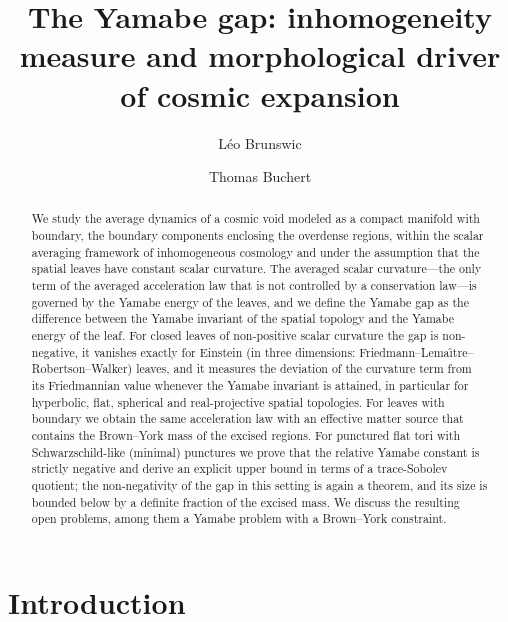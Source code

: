 \documentclass[aps,prd,reprint,amsmath,amssymb,nofootinbib,longbibliography]{revtex4-2}
\theoremstyle{plain}
\theoremstyle{definition}
\theoremstyle{remark}
\begin{document}
%
\title{The Yamabe gap: inhomogeneity measure and morphological driver of cosmic expansion}
%
\author{L\'eo Brunswic}
\author{Thomas Buchert}
%
\begin{abstract}
We study the average dynamics of a cosmic void modeled as a compact manifold with boundary, the boundary components enclosing the overdense regions, within the scalar averaging framework of inhomogeneous cosmology and under the assumption that the spatial leaves have constant scalar curvature. The averaged scalar curvature---the only term of the averaged acceleration law that is not controlled by a conservation law---is governed by the Yamabe energy of the leaves, and we define the Yamabe gap as the difference between the Yamabe invariant of the spatial topology and the Yamabe energy of the leaf. For closed leaves of non-positive scalar curvature the gap is non-negative, it vanishes exactly for Einstein (in three dimensions: Friedmann--Lema\^{\i}tre--Robertson--Walker) leaves, and it measures the deviation of the curvature term from its Friedmannian value whenever the Yamabe invariant is attained, in particular for hyperbolic, flat, spherical and real-projective spatial topologies. For leaves with boundary we obtain the same acceleration law with an effective matter source that contains the Brown--York mass of the excised regions. For punctured flat tori with Schwarzschild-like (minimal) punctures we prove that the relative Yamabe constant is strictly negative and derive an explicit upper bound in terms of a trace-Sobolev quotient; the non-negativity of the gap in this setting is again a theorem, and its size is bounded below by a definite fraction of the excised mass. We discuss the resulting open problems, among them a Yamabe problem with a Brown--York constraint.
\end{abstract}
%
\maketitle
%
\section{Introduction}
\label{sec:intro}
\end{document}
